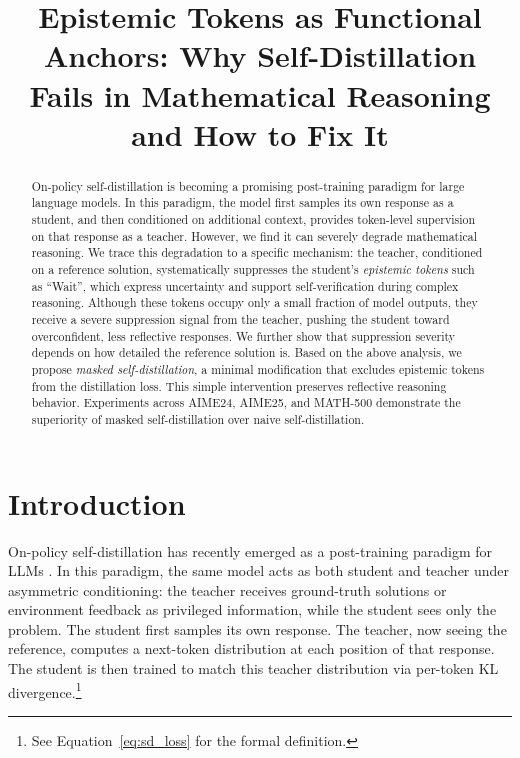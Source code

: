 \documentclass[11pt]{article}
\title{Epistemic Tokens as Functional Anchors: Why Self-Distillation Fails in Mathematical Reasoning and How to Fix It}
\author{}
\begin{document}
\maketitle

\begin{abstract}
On-policy self-distillation is becoming a promising post-training paradigm for large language models.
In this paradigm, the model first samples its own response as a student, and then conditioned on additional context, provides token-level supervision on that response as a teacher.
However, we find it can severely degrade mathematical reasoning.
We trace this degradation to a specific mechanism: the teacher, conditioned on a reference solution, systematically suppresses the student's \textit{epistemic tokens} such as ``Wait'', which express uncertainty and support self-verification during complex reasoning.
Although these tokens occupy only a small fraction of model outputs, they receive a severe suppression signal from the teacher, pushing the student toward overconfident, less reflective responses.
We further show that suppression severity depends on how detailed the reference solution is.
Based on the above analysis, we propose \textit{masked self-distillation}, a minimal modification that excludes epistemic tokens from the distillation loss.
This simple intervention preserves reflective reasoning behavior.
Experiments across AIME24, AIME25, and MATH-500 demonstrate the superiority of masked self-distillation over naive self-distillation.
\end{abstract}

\section{Introduction}

On-policy self-distillation has recently emerged as a post-training paradigm for LLMs \cite{hubotter2026reinforcement,zhang2026opsdl,jin2026unisd,zhang2026simple}.
In this paradigm, the same model acts as both student and teacher under asymmetric conditioning: the teacher receives ground-truth solutions or environment feedback as privileged information, while the student sees only the problem.
The student first samples its own response. The teacher, now seeing the reference, computes a next-token distribution at each position of that response. The student is then trained to match this teacher distribution via per-token KL divergence.\footnote{See Equation~\ref{eq:sd_loss} for the formal definition.}
\end{document}
